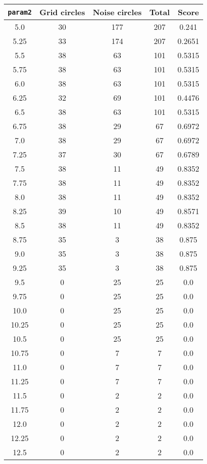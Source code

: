 \documentclass[letterpaper, 12pt]{article}
\begin{document}
\begin{longtable}{|c|c|c|c|c|}
\hline
\textbf{\texttt{param2}} & \textbf{Grid circles} & \textbf{Noise circles} & \textbf{Total} & \textbf{Score} \\
\hline
5.0 & 30 & 177 & 207 & 0.241 \\
\hline
5.25 & 33 & 174 & 207 & 0.2651 \\
\hline
5.5 & 38 & 63 & 101 & 0.5315 \\
\hline
5.75 & 38 & 63 & 101 & 0.5315 \\
\hline
6.0 & 38 & 63 & 101 & 0.5315 \\
\hline
6.25 & 32 & 69 & 101 & 0.4476 \\
\hline
6.5 & 38 & 63 & 101 & 0.5315 \\
\hline
6.75 & 38 & 29 & 67 & 0.6972 \\
\hline
7.0 & 38 & 29 & 67 & 0.6972 \\
\hline
7.25 & 37 & 30 & 67 & 0.6789 \\
\hline
7.5 & 38 & 11 & 49 & 0.8352 \\
\hline
7.75 & 38 & 11 & 49 & 0.8352 \\
\hline
8.0 & 38 & 11 & 49 & 0.8352 \\
\hline
8.25 & 39 & 10 & 49 & 0.8571 \\
\hline
8.5 & 38 & 11 & 49 & 0.8352 \\
\hline
8.75 & 35 & 3 & 38 & 0.875 \\
\hline
9.0 & 35 & 3 & 38 & 0.875 \\
\hline
9.25 & 35 & 3 & 38 & 0.875 \\
\hline
9.5 & 0 & 25 & 25 & 0.0 \\
\hline
9.75 & 0 & 25 & 25 & 0.0 \\
\hline
10.0 & 0 & 25 & 25 & 0.0 \\
\hline
10.25 & 0 & 25 & 25 & 0.0 \\
\hline
10.5 & 0 & 25 & 25 & 0.0 \\
\hline
10.75 & 0 & 7 & 7 & 0.0 \\
\hline
11.0 & 0 & 7 & 7 & 0.0 \\
\hline
11.25 & 0 & 7 & 7 & 0.0 \\
\hline
11.5 & 0 & 2 & 2 & 0.0 \\
\hline
11.75 & 0 & 2 & 2 & 0.0 \\
\hline
12.0 & 0 & 2 & 2 & 0.0 \\
\hline
12.25 & 0 & 2 & 2 & 0.0 \\
\hline
12.5 & 0 & 2 & 2 & 0.0 \\

\end{longtable}
\end{document}
